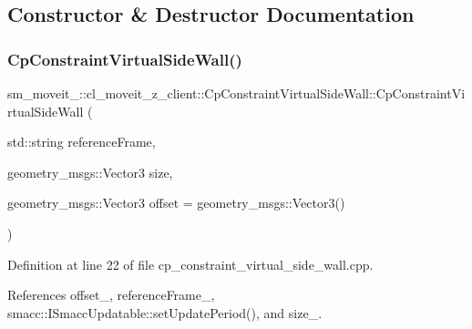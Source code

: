 \subsection{Constructor \& Destructor Documentation}
\mbox{\label{classsm__moveit__4_1_1cl__moveit__z__client_1_1CpConstraintVirtualSideWall_a500307e89d0343f1679d25a7f8fb40ce}} 
\subsubsection{\texorpdfstring{Cp\+Constraint\+Virtual\+Side\+Wall()}{CpConstraintVirtualSideWall()}}
{\footnotesize\ttfamily sm\+\_\+moveit\+\_\+::cl\+\_\+moveit\+\_\+z\+\_\+client\+::\+Cp\+Constraint\+Virtual\+Side\+Wall\+::\+Cp\+Constraint\+Virtual\+Side\+Wall (\begin{DoxyParamCaption}\item[{std\+::string}]{reference\+Frame,  }\item[{geometry\+\_\+msgs\+::\+Vector3}]{size,  }\item[{geometry\+\_\+msgs\+::\+Vector3}]{offset = {\ttfamily geometry\+\_\+msgs\+:\+:Vector3()} }\end{DoxyParamCaption})}



Definition at line 22 of file cp\+\_\+constraint\+\_\+virtual\+\_\+side\+\_\+wall.\+cpp.



References offset\+\_\+, reference\+Frame\+\_\+, smacc\+::\+I\+Smacc\+Updatable\+::set\+Update\+Period(), and size\+\_\+.


